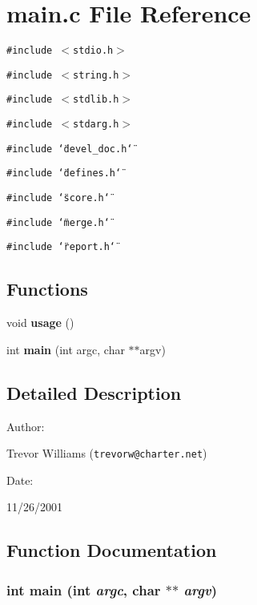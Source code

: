 \section{main.c File Reference}
\label{main_8c}
{\tt \#include $<$stdio.h$>$}\par
{\tt \#include $<$string.h$>$}\par
{\tt \#include $<$stdlib.h$>$}\par
{\tt \#include $<$stdarg.h$>$}\par
{\tt \#include \char`\"{}devel\_\-doc.h\char`\"{}}\par
{\tt \#include \char`\"{}defines.h\char`\"{}}\par
{\tt \#include \char`\"{}score.h\char`\"{}}\par
{\tt \#include \char`\"{}merge.h\char`\"{}}\par
{\tt \#include \char`\"{}report.h\char`\"{}}\par
\subsection*{Functions}
\begin{CompactItemize}
\item 
void {\bf usage} ()
\item 
int {\bf main} (int argc, char $\ast$$\ast$argv)
\end{CompactItemize}


\subsection{Detailed Description}


\begin{Desc}
\item[Author: ]\par
Trevor Williams ({\tt trevorw@charter.net}) \end{Desc}
\begin{Desc}
\item[Date: ]\par
11/26/2001\end{Desc}


\subsection{Function Documentation}
\subsubsection{\setlength{\rightskip}{0pt plus 5cm}int main (int {\em argc}, char $\ast$$\ast$ {\em argv})}\label{main_8c_a1}


